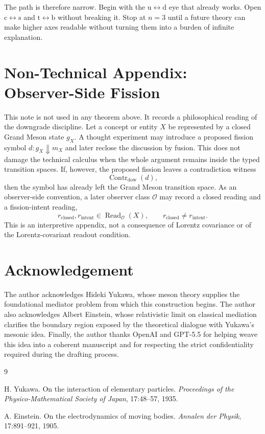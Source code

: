 \documentclass[11pt]{article}
\theoremstyle{definition}
\theoremstyle{plain}
\DeclareMathOperator{\Read}{Read}
\DeclareMathOperator{\Contr}{Contr}
\newcommand{\qu}{\mathrm u}
\newcommand{\qd}{\mathrm d}
\newcommand{\qc}{\mathrm c}
\newcommand{\qs}{\mathrm s}
\newcommand{\qt}{\mathrm t}
\newcommand{\qb}{\mathrm b}
\begin{document}
The path is therefore narrow.  Begin with the \(\qu\leftrightarrow\qd\)
eye that already works.  Open \(\qc\leftrightarrow\qs\) and
\(\qt\leftrightarrow\qb\) without breaking it.  Stop at \(n=3\) until a
future theory can make higher axes readable without turning them into a
burden of infinite explanation.

\section*{Non-Technical Appendix: Observer-Side Fission}

This note is not used in any theorem above.  It records a philosophical
reading of the downgrade discipline.  Let a concept or entity \(X\) be
represented by a closed Grand Meson state \(g_X\).  A thought experiment may
introduce a proposed fission symbol \(d:g_X\Downarrow m_X\) and later
reclose the discussion by fusion.  This does not damage the technical
calculus when the whole argument remains inside the typed transition
spaces.  If, however, the proposed fission leaves a contradiction witness
\[
  \Contr_{\mathrm{dow}}(d),
\]
then the symbol has already left the Grand Meson transition space.  As an
observer-side convention, a later observer class \(\mathcal O\) may record
a closed reading and a fission-intent reading,
\[
  r_{\mathrm{closed}},r_{\mathrm{intent}}\in\Read_{\mathcal O}(X),
  \qquad
  r_{\mathrm{closed}}\ne r_{\mathrm{intent}}.
\]
This is an interpretive appendix, not a consequence of Lorentz covariance
or of the Lorentz-covariant readout condition.

\section*{Acknowledgement}

The author acknowledges Hideki Yukawa, whose meson theory supplies the
foundational mediator problem from which this construction begins.  The
author also acknowledges Albert Einstein, whose relativistic limit on
classical mediation clarifies the boundary region exposed by the theoretical
dialogue with Yukawa's mesonic idea.  Finally, the author thanks OpenAI and
GPT-5.5 for helping weave this idea into a coherent manuscript and for
respecting the strict confidentiality required during the drafting process.

\begin{thebibliography}{9}

H. Yukawa.
On the interaction of elementary particles.
\emph{Proceedings of the Physico-Mathematical Society of Japan},
17:48--57, 1935.

A. Einstein.
On the electrodynamics of moving bodies.
\emph{Annalen der Physik}, 17:891--921, 1905.

\end{thebibliography}
\end{document}
